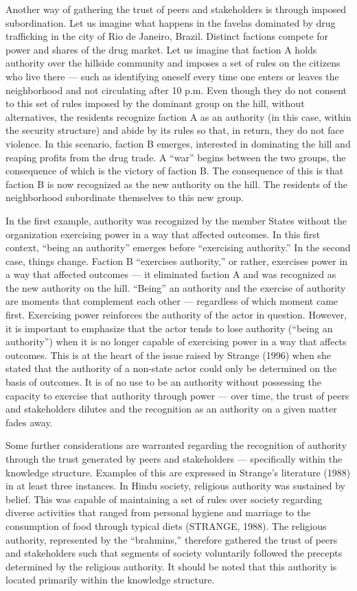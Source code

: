 Another way of gathering the trust of peers and stakeholders is through imposed subordination. Let us imagine what happens in the favelas dominated by drug trafficking in the city of Rio de Janeiro, Brazil. Distinct factions compete for power and shares of the drug market. Let us imagine that faction A holds authority over the hillside community and imposes a set of rules on the citizens who live there --- such as identifying oneself every time one enters or leaves the neighborhood and not circulating after 10 p.m. Even though they do not consent to this set of rules imposed by the dominant group on the hill, without alternatives, the residents recognize faction A as an authority (in this case, within the security structure) and abide by its rules so that, in return, they do not face violence. In this scenario, faction B emerges, interested in dominating the hill and reaping profits from the drug trade. A ``war'' begins between the two groups, the consequence of which is the victory of faction B. The consequence of this is that faction B is now recognized as the new authority on the hill. The residents of the neighborhood subordinate themselves to this new group.

In the first example, authority was recognized by the member States without the organization exercising power in a way that affected outcomes. In this first context, ``being an authority'' emerges before ``exercising authority.'' In the second case, things change. Faction B ``exercises authority,'' or rather, exercises power in a way that affected outcomes --- it eliminated faction A and was recognized as the new authority on the hill. ``Being'' an authority and the exercise of authority are moments that complement each other --- regardless of which moment came first. Exercising power reinforces the authority of the actor in question. However, it is important to emphasize that the actor tends to lose authority (``being an authority'') when it is no longer capable of exercising power in a way that affects outcomes. This is at the heart of the issue raised by Strange (1996) when she stated that the authority of a non-state actor could only be determined on the basis of outcomes. It is of no use to be an authority without possessing the capacity to exercise that authority through power --- over time, the trust of peers and stakeholders dilutes and the recognition as an authority on a given matter fades away.

Some further considerations are warranted regarding the recognition of authority through the trust generated by peers and stakeholders --- specifically within the knowledge structure. Examples of this are expressed in Strange's literature (1988) in at least three instances. In Hindu society, religious authority was sustained by belief. This was capable of maintaining a set of rules over society regarding diverse activities that ranged from personal hygiene and marriage to the consumption of food through typical diets (STRANGE, 1988). The religious authority, represented by the ``brahmins,'' therefore gathered the trust of peers and stakeholders such that segments of society voluntarily followed the precepts determined by the religious authority. It should be noted that this authority is located primarily within the knowledge structure.

